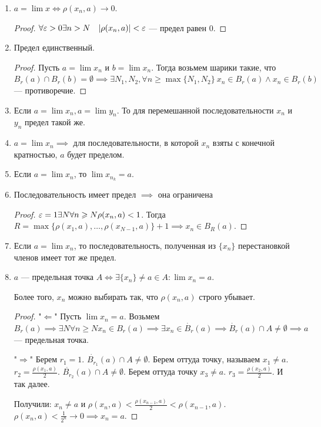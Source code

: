 \begin{properties}
    \begin{enumerate}
        \item $a = \lim x \iff \rho(x_n, a) \to 0$.
\begin{proof}
             $\forall \varepsilon > 0 \exists n > N\quad |\rho(x_n, a)| < \varepsilon$ --- предел равен 0.
\end{proof}
        \item Предел единственный. 
            \begin{proof}
                Пусть $a = \lim x_n$ и $b = \lim x_n$. Тогда возьмем шарики такие, что  $B_r(a) \cap B_r(b) = \emptyset \implies \exists N_1, N_2, \forall n \ge \max\{N_1, N_2\}\ x_n \in B_r(a) \land x_n \in B_r(b)$ --- противоречие.
            \end{proof}
        \item Если $a = \lim x_n, a = \lim y_n$. То для перемешанной последовательности $x_n$ и  $y_n$ предел такой же.
        \item  $a = \lim x_n \implies $ для последовательности, в которой $x_n$ взяты с конечной кратностью, $a$ будет пределом.
        \item Если $a = \lim x_n$, то  $\lim x_{n_k} = a$.
        \item Последовательность имеет предел $\implies$ она ограничена
             \begin{proof}
                $\varepsilon = 1 \exists N \forall n \geqslant N \rho(x_n, a) < 1$. Тогда $R = \max\{\rho(x_1, a), \ldots, \rho(x_{N-1}, a)\} + 1 \implies x_n \in B_R(a)$.
            \end{proof}
        \item Если $a = \lim x_n$, то последовательность, полученная из  $\{x_n\}$ перестановкой членов имеет тот же предел.
        \item $a$ --- предельная точка  $A \iff \exists \{x_n\} \neq a \in A\!: \lim x_n = a$.

            Более того,  $x_n$ можно выбирать так, что  $\rho(x_n, a)$ строго убывает.
            \begin{proof}
                "$\Leftarrow$" Пусть  $\lim x_n = a$. Возьмем  $B_r(a) \implies \exists N \forall n \ge N x_n \in B_r(a) \implies \exists x_n \in \dot{B_r}(a) \implies \dot{B_r}(a) \cap A \neq \emptyset \implies a$ --- предельная точка.

                "$\Rightarrow$" Берем  $r_1 = 1$. $\dot{B_{r_1}}(a) \cap A \neq \emptyset$. Берем оттуда точку, называем  $x_1 \neq a$. $r_2 = \frac{\rho(x_1,a)}{2}$. $\dot{B_{r_2}}(a) \cap A \neq \emptyset$. Берем оттуда точку $x_3 \neq a$. $r_3 = \frac{\rho(x_2, a)}{2}$. И так далее.

                Получили: $x_n \neq a$ и  $\rho(x_n, a) < \frac{\rho(x_{n-1}, a)}{2} < \rho(x_{n-1}, a)$. $\rho(x_n, a) < \frac{1}{2^n} \to 0 \implies x_n = a$.
            \end{proof}
    \end{enumerate}
\end{properties}
